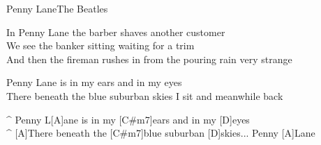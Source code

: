 \begin{song}{Penny Lane}{The Beatles}
\begin{guitar}
In Penny Lane the barber shaves another customer\\
We see the banker sitting waiting for a trim\\
And then the fireman rushes in from the pouring rain   very strange\\
\end{guitar}


\begin{guitar}
Penny Lane is in my ears and in my eyes\\
There beneath the blue suburban skies I sit and meanwhile back\\
\end{guitar}

\begin{guitar}
^ Penny L[A]ane is in my [C#m7]ears and in my [D]eyes\\
^ [A]There beneath the [C#m7]blue suburban [D]skies... Penny [A]Lane\\
\end{guitar}
\end{song}
